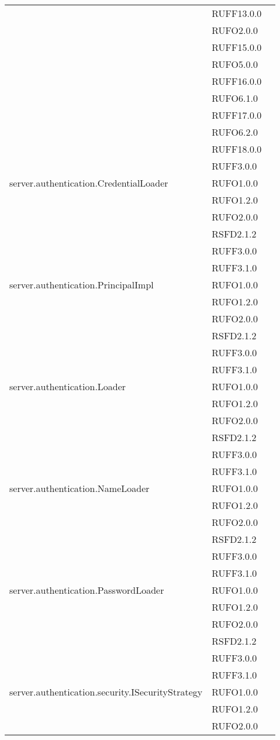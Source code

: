 \begin{center}
\begin{longtable}{lp{}l}
 & RUFF13.0.0 \\
 & RUFO2.0.0 \\
 & RUFF15.0.0 \\
 & RUFO5.0.0 \\
 & RUFF16.0.0 \\
 & RUFO6.1.0 \\
 & RUFF17.0.0 \\
 & RUFO6.2.0 \\
 & RUFF18.0.0 \\
 & RUFF3.0.0 \\
server.authentication.CredentialLoader & RUFO1.0.0 \\
 & RUFO1.2.0 \\
 & RUFO2.0.0 \\
 & RSFD2.1.2 \\
 & RUFF3.0.0 \\
 & RUFF3.1.0 \\
server.authentication.PrincipalImpl & RUFO1.0.0 \\
 & RUFO1.2.0 \\
 & RUFO2.0.0 \\
 & RSFD2.1.2 \\
 & RUFF3.0.0 \\
 & RUFF3.1.0 \\
server.authentication.Loader & RUFO1.0.0 \\
 & RUFO1.2.0 \\
 & RUFO2.0.0 \\
 & RSFD2.1.2 \\
 & RUFF3.0.0 \\
 & RUFF3.1.0 \\
server.authentication.NameLoader & RUFO1.0.0 \\
 & RUFO1.2.0 \\
 & RUFO2.0.0 \\
 & RSFD2.1.2 \\
 & RUFF3.0.0 \\
 & RUFF3.1.0 \\
server.authentication.PasswordLoader & RUFO1.0.0 \\
 & RUFO1.2.0 \\
 & RUFO2.0.0 \\
 & RSFD2.1.2 \\
 & RUFF3.0.0 \\
 & RUFF3.1.0 \\
server.authentication.security.ISecurityStrategy & RUFO1.0.0 \\
 & RUFO1.2.0 \\
 & RUFO2.0.0 \\

\end{longtable}
\end{center}
